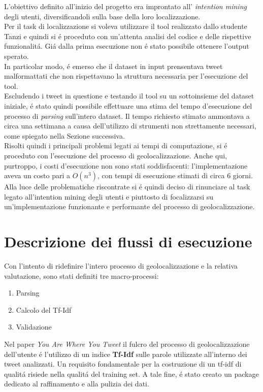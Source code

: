 \documentclass[twocolumn,10pt]{asme2ej}
\begin{document}
L'obiettivo definito all'inizio del progetto era improntato all' \textit{intention mining} degli utenti, diversificandoli sulla base della loro localizzazione. \\ Per il task di localizzazione si voleva utilizzare il tool realizzato dallo studente Tanzi e quindi si \'e proceduto con un'attenta analisi del codice e delle rispettive funzionalit\'a.
Gi\'a dalla prima esecuzione non \'e stato possibile ottenere l'output sperato. \\In particolar modo, \'e emerso che il dataset in input prensentava tweet malformattati che non rispettavano la struttura necessaria per l'esecuzione del tool. \\ Escludendo i tweet in questione e testando il tool su un sottoinsieme del dataset iniziale, \'e stato quindi possibile effettuare una stima del tempo d'esecuzione del processo di \textit{parsing} sull'intero dataset. Il tempo richiesto stimato ammontava a circa una settimana a causa dell'utilizzo di strumenti non strettamente necessari, come spiegato nella Sezione successiva.  \\ Risolti quindi i principali problemi legati ai tempi di computazione, si \'e proceduto con l'esecuzione del processo di geolocalizzazione. Anche qui, purtroppo, i costi d'esecuzione non sono stati soddisfacenti: l'implementazione aveva un costo pari a $O(n^3)$, con tempi di esecuzione stimati di circa 6 giorni.\\ Alla luce delle problematiche riscontrate si \'e quindi deciso di rinunciare al task legato all'intention mining degli utenti e piuttosto di focalizzarsi su un'implementazione funzionante e performante del processo di geolocalizzazione.

\section{Descrizione dei flussi di esecuzione}


Con l'intento di ridefinire l'intero processo di geolocalizzazione e la relativa valutazione, sono stati definiti tre macro-processi:
\begin{enumerate}
\item Parsing
\item Calcolo del Tf-Idf
\item Validazione
\end{enumerate}   

Nel paper \textit{You Are Where You Tweet} il fulcro del processo di geolocalizzazione dell'utente \'e l'utilizzo di un indice \textbf{Tf-Idf} sulle parole utilizzate all'interno dei tweet analizzati. Un requisito fondamentale per la costruzione di un tf-idf di qualit\'a risiede nella qualit\'a del training set. A tale fine, \'e stato creato un package dedicato al raffinamento e alla pulizia dei dati. 
\end{document}
